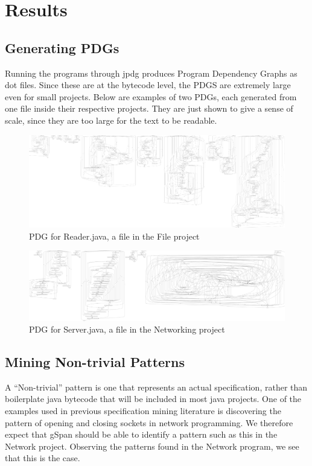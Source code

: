 \documentclass[12pt]{article}
\begin{document}
\section{Results}
\subsection{Generating PDGs}
Running the programs through jpdg produces Program Dependency Graphs as dot files. Since these are at the bytecode level, the PDGS are extremely large even for small projects. Below are examples of two PDGs, each generated from one file inside their respective projects. They are just shown to give a sense of scale, since they are too large for the text to be readable.

\begin{figure}[ht]
\centerline{
\includegraphics[width=\linewidth]{patterns/reader_pdg_full.png}
}
\caption{\label{reader_pca}
    PDG for Reader.java, a file in the File project
}
\end{figure}


\begin{figure}[ht]
\centerline{
\includegraphics[width=\linewidth]{patterns/full_network_small.png}
}
\caption{\label{server_pdg}
    PDG for Server.java, a file in the Networking project
}
\end{figure}

\subsection{Mining Non-trivial Patterns}
A ``Non-trivial'' pattern is one that represents an actual specification, rather than boilerplate java bytecode that will be included in most java projects. One of the examples used in previous specification mining literature is discovering the pattern of opening and closing sockets in network programming. We therefore expect that gSpan should be able to identify a pattern such as this in the Network project. Observing the patterns found in the Network program, we see that this is the case.
\end{document}
